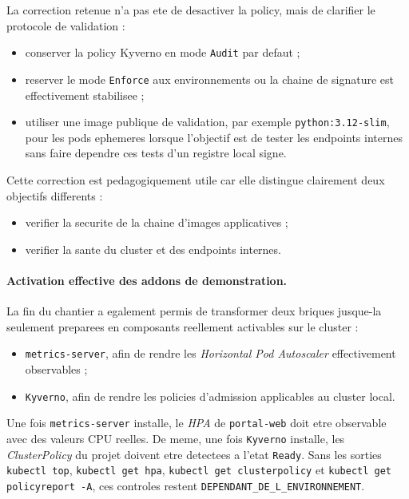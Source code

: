 La correction retenue n'a pas ete de desactiver la policy, mais de clarifier le protocole de validation :

\begin{itemize}
  \item conserver la policy Kyverno en mode \texttt{Audit} par defaut ;
  \item reserver le mode \texttt{Enforce} aux environnements ou la chaine de signature est effectivement stabilisee ;
  \item utiliser une image publique de validation, par exemple \texttt{python:3.12-slim}, pour les pods ephemeres lorsque l'objectif est de tester les endpoints internes sans faire dependre ces tests d'un registre local signe.
\end{itemize}

Cette correction est pedagogiquement utile car elle distingue clairement deux objectifs differents :

\begin{itemize}
  \item verifier la securite de la chaine d'images applicatives ;
  \item verifier la sante du cluster et des endpoints internes.
\end{itemize}

\paragraph{Activation effective des addons de demonstration.}
La fin du chantier a egalement permis de transformer deux briques jusque-la seulement preparees en composants reellement activables sur le cluster :

\begin{itemize}
  \item \texttt{metrics-server}, afin de rendre les \textit{Horizontal Pod Autoscaler} effectivement observables ;
  \item \texttt{Kyverno}, afin de rendre les policies d'admission applicables au cluster local.
\end{itemize}

Une fois \texttt{metrics-server} installe, le \textit{HPA} de \texttt{portal-web} doit etre observable avec des valeurs CPU reelles. De meme, une fois \texttt{Kyverno} installe, les \textit{ClusterPolicy} du projet doivent etre detectees a l'etat \texttt{Ready}. Sans les sorties \texttt{kubectl top}, \texttt{kubectl get hpa}, \texttt{kubectl get clusterpolicy} et \texttt{kubectl get policyreport -A}, ces controles restent \texttt{DEPENDANT\_DE\_L\_ENVIRONNEMENT}.

